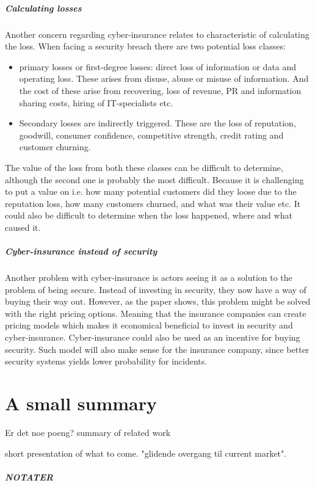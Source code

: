 \subparagraph{Calculating losses} Another concern regarding cyber-insurance relates to characteristic of calculating the loss. When facing a security breach there are two potential loss classes:\cite{bandyopadhyay2009managers,mehr1980principles} 
\begin{itemize}
\item primary losses or first-degree losses: direct loss of information or data and operating loss. 
These arises from disuse, abuse or misuse of information.
 And the cost of these arise from recovering, loss of revenue, 
 PR and information sharing costs, hiring of IT-specialists etc.
 \item Secondary losses are indirectly triggered. These are the loss of reputation, goodwill, 
consumer confidence, competitive strength, credit rating and customer churning. 
\end{itemize}
The value of the loss from both these classes can be difficult to determine, although the second one is probably the most difficult. Because it is challenging to put a value on i.e. how many potential customers did they loose due to the reputation loss, how many customers churned, and what was their value etc.
It could also be difficult to determine when the loss happened, where and what caused it.


\subparagraph{Cyber-insurance instead of security}
Another problem with cyber-insurance is actors seeing it as a solution to the problem of being secure. Instead of investing in security, they now have a way of buying their way out. 
However, as the paper \cite{bolot2008cyber} shows, this problem might be solved with the right pricing options. Meaning that the insurance companies can create pricing models which makes it economical beneficial to invest in security and cyber-insurance. Cyber-insurance could also be used as an incentive for buying security. Such model will also make sense for the insurance company, since better security systems yields lower probability for incidents.


\section{A small summary}
Er det noe poeng?
summary of related work  

short presentation of what to come. "glidende overgang til current market".

\subparagraph{NOTATER}
